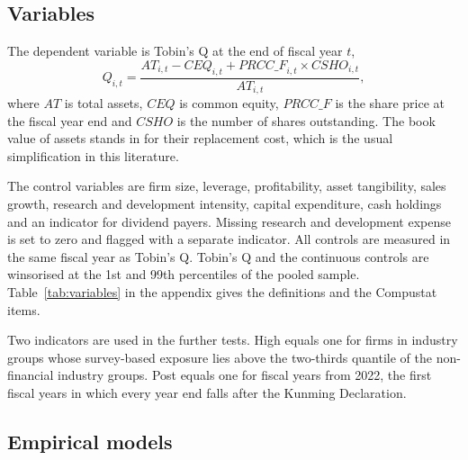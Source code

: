 \documentclass[12pt,a4paper]{article}
\begin{document}
\subsection{Variables}

The dependent variable is Tobin's Q at the end of fiscal year $t$,
\begin{equation}
Q_{i,t} = \frac{\mathit{AT}_{i,t} - \mathit{CEQ}_{i,t} + \mathit{PRCC\_F}_{i,t} \times \mathit{CSHO}_{i,t}}{\mathit{AT}_{i,t}},
\end{equation}
where $\mathit{AT}$ is total assets, $\mathit{CEQ}$ is common equity, $\mathit{PRCC\_F}$ is the share price at the fiscal year end and $\mathit{CSHO}$ is the number of shares outstanding. The book value of assets stands in for their replacement cost, which is the usual simplification in this literature.

The control variables are firm size, leverage, profitability, asset tangibility, sales growth, research and development intensity, capital expenditure, cash holdings and an indicator for dividend payers. Missing research and development expense is set to zero and flagged with a separate indicator. All controls are measured in the same fiscal year as Tobin's Q. Tobin's Q and the continuous controls are winsorised at the 1st and 99th percentiles of the pooled sample. Table~\ref{tab:variables} in the appendix gives the definitions and the Compustat items.

Two indicators are used in the further tests. High equals one for firms in industry groups whose survey-based exposure lies above the two-thirds quantile of the non-financial industry groups. Post equals one for fiscal years from 2022, the first fiscal years in which every year end falls after the Kunming Declaration.

\subsection{Empirical models}
\end{document}
